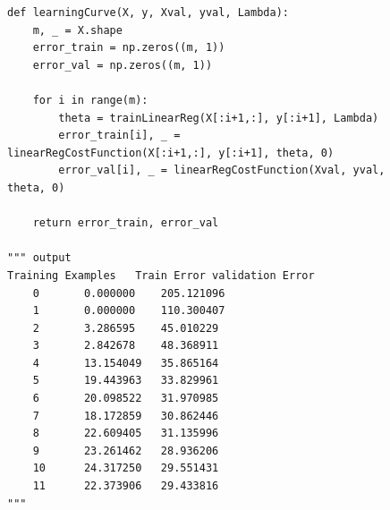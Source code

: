 \begin{figure}[!h]
\begin{verbatim}
def learningCurve(X, y, Xval, yval, Lambda):
    m, _ = X.shape
    error_train = np.zeros((m, 1))
    error_val = np.zeros((m, 1))

    for i in range(m):
        theta = trainLinearReg(X[:i+1,:], y[:i+1], Lambda)
        error_train[i], _ = linearRegCostFunction(X[:i+1,:], y[:i+1], theta, 0)
        error_val[i], _ = linearRegCostFunction(Xval, yval, theta, 0)

    return error_train, error_val

""" output
Training Examples   Train Error validation Error
    0       0.000000    205.121096
    1       0.000000    110.300407
    2       3.286595    45.010229
    3       2.842678    48.368911
    4       13.154049   35.865164
    5       19.443963   33.829961
    6       20.098522   31.970985
    7       18.172859   30.862446
    8       22.609405   31.135996
    9       23.261462   28.936206
    10      24.317250   29.551431
    11      22.373906   29.433816
"""
\end{verbatim}   
\end{figure}


